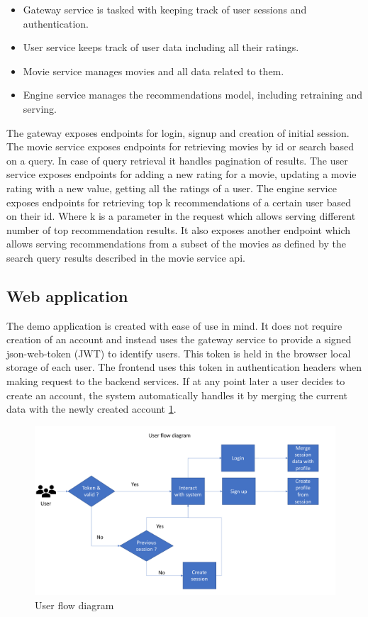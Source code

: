 \begin{itemize}
    \item Gateway service is tasked with keeping track of user sessions and authentication.
    \item User service keeps track of user data including all their ratings.
    \item Movie service manages movies and all data related to them.
    \item Engine service manages the recommendations model, including retraining and serving.
\end{itemize}
The gateway exposes endpoints for login, signup and creation of initial session.
The movie service exposes endpoints for retrieving movies by id or search based on a query. In case of query retrieval it handles pagination of results.
The user service exposes endpoints for adding a new rating for a movie, updating a movie rating with a new value, getting all the ratings of a user.
The engine service exposes endpoints for retrieving top k recommendations of a certain user based on their id. Where k is a parameter in the request which allows serving different number of top recommendation results. It also exposes another endpoint which allows serving recommendations from a subset of the movies as defined by the search query results described in the movie service api. 


\subsection{Web application}
The demo application is created with ease of use in mind. It does not require creation of an account and instead uses the gateway service to provide a signed json-web-token (JWT) to identify users. This token is held in the browser local storage of each user. The frontend uses this token in authentication headers when making request to the backend services. 
If at any point later a user decides to create an account, the system automatically handles it by merging the current data with the newly created account \ref{user_flow}.
\begin{figure}[h!]
    \includegraphics[scale=0.4]{user_flow_diagram}
    \caption{User flow diagram}
    \label{user_flow}
\end{figure}

